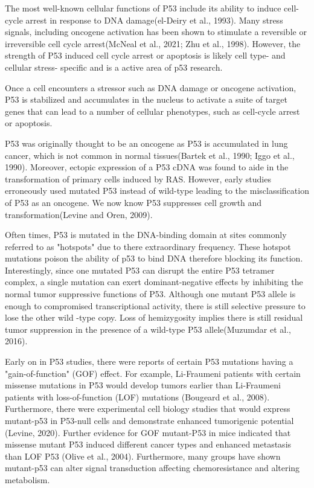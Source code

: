 The most well-known cellular functions of P53 include its ability to induce cell-cycle arrest in response to DNA damage(el-Deiry et al., 1993). Many stress signals, including oncogene activation has been shown to stimulate a reversible or irreversible cell cycle arrest(McNeal et al., 2021; Zhu et al., 1998). However, the strength of P53 induced cell cycle arrest or apoptosis is likely cell type- and cellular stress- specific and is a active area of p53 research.

Once a cell encounters a stressor such as DNA damage or oncogene activation, P53 is stabilized and accumulates in the nucleus to activate a suite of target genes that can lead to a number of cellular phenotypes, such as cell-cycle arrest or apoptosis.

P53 was originally thought to be an oncogene as P53 is accumulated in lung cancer, which is not common in normal tissues(Bartek et al., 1990; Iggo et al., 1990). Moreover, ectopic expression of a P53 cDNA was found to aide in the transformation of primary cells induced by RAS. However, early studies erroneously used mutated P53 instead of wild-type leading to the misclassification of P53 as an oncogene. We now know P53 suppresses cell growth and transformation(Levine and Oren, 2009).

Often times, P53 is mutated in the DNA-binding domain at sites commonly referred to as "hotspots" due to there extraordinary frequency. These hotspot mutations poison the ability of p53 to bind DNA therefore blocking its function. Interestingly, since one mutated P53 can disrupt the entire P53 tetramer complex, a single mutation can exert dominant-negative effects by inhibiting the normal tumor suppressive functions of P53. Although one mutant P53 allele is enough to compromised transcriptional activity, there is still selective pressure to lose the other wild -type copy. Loss of hemizygosity implies there is still residual tumor suppression in the presence of a wild-type P53 allele(Muzumdar et al., 2016).

Early on in P53 studies, there were reports of certain P53 mutations having a "gain-of-function" (GOF) effect. For example, Li-Fraumeni patients with certain missense mutations in P53 would develop tumors earlier than Li-Fraumeni patients with loss-of-function (LOF) mutations (Bougeard et al., 2008). Furthermore, there were experimental cell biology studies that would express mutant-p53 in P53-null cells and demonstrate enhanced tumorigenic potential (Levine, 2020). Further evidence for GOF mutant-P53 in mice indicated that missense mutant P53 induced different cancer types and enhanced metastasis than LOF P53 (Olive et al., 2004). Furthermore, many groups have shown mutant-p53 can alter signal transduction affecting chemoresistance and altering metabolism.

